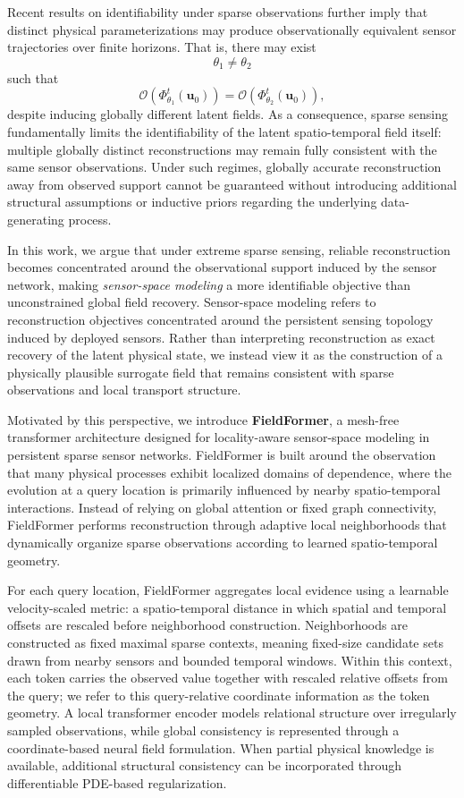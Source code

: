 Recent results on identifiability under sparse observations \citep{norden2025importancestructuralidentifiabilitymachine,wieland2021structural} further imply that distinct physical parameterizations may produce observationally equivalent sensor trajectories over finite horizons. That is, there may exist
\[
\theta_1 \neq \theta_2
\]
such that
\[
\mathcal{O}(\Phi_{\theta_1}^t(\mathbf{u}_0))
=
\mathcal{O}(\Phi_{\theta_2}^t(\mathbf{u}_0)),
\]
despite inducing globally different latent fields. As a consequence, sparse sensing fundamentally limits the identifiability of the latent spatio-temporal field itself: multiple globally distinct reconstructions may remain fully consistent with the same sensor observations. Under such regimes, globally accurate reconstruction away from observed support cannot be guaranteed without introducing additional structural assumptions or inductive priors regarding the underlying data-generating process.

In this work, we argue that under extreme sparse sensing, reliable reconstruction becomes concentrated around the observational support induced by the sensor network, making \emph{sensor-space modeling} a more identifiable objective than unconstrained global field recovery. Sensor-space modeling refers to reconstruction objectives concentrated around the persistent sensing topology induced by deployed sensors. Rather than interpreting reconstruction as exact recovery of the latent physical state, we instead view it as the construction of a physically plausible surrogate field that remains consistent with sparse observations and local transport structure.

Motivated by this perspective, we introduce \textbf{FieldFormer}, a mesh-free transformer architecture designed for locality-aware sensor-space modeling in persistent sparse sensor networks. FieldFormer is built around the observation that many physical processes exhibit localized domains of dependence, where the evolution at a query location is primarily influenced by nearby spatio-temporal interactions. Instead of relying on global attention or fixed graph connectivity, FieldFormer performs reconstruction through adaptive local neighborhoods that dynamically organize sparse observations according to learned spatio-temporal geometry.

For each query location, FieldFormer aggregates local evidence using a learnable velocity-scaled metric: a spatio-temporal distance in which spatial and temporal offsets are rescaled before neighborhood construction. Neighborhoods are constructed as fixed maximal sparse contexts, meaning fixed-size candidate sets drawn from nearby sensors and bounded temporal windows. Within this context, each token carries the observed value together with rescaled relative offsets from the query; we refer to this query-relative coordinate information as the token geometry. A local transformer encoder models relational structure over irregularly sampled observations, while global consistency is represented through a coordinate-based neural field formulation. When partial physical knowledge is available, additional structural consistency can be incorporated through differentiable PDE-based regularization.

